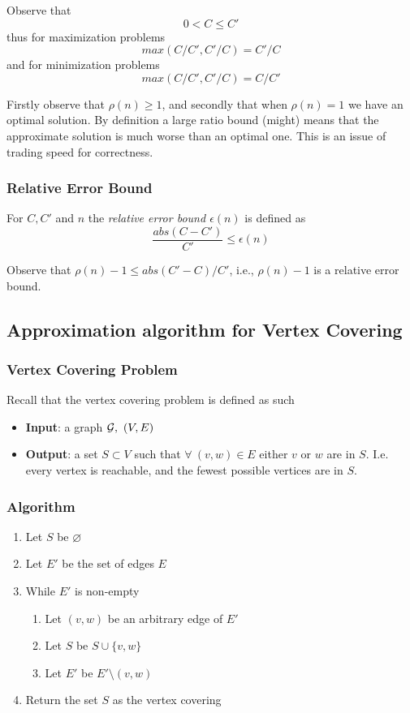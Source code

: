 Observe that
$$ 0 < C \leq C\prime $$
thus for maximization problems
$$ max(C/C\prime, C\prime/C) = C\prime/C $$
and for minimization problems
$$ max(C/C\prime, C\prime/C) = C/C\prime $$

Firstly observe that $\rho(n) \geq 1$,
and secondly that when $\rho(n) = 1$ we have an optimal solution.
By definition a large ratio bound (might) means that the approximate
solution is much worse than an optimal one.
This is an issue of trading speed for correctness.

\subsubsection{Relative Error Bound}
\begin{definition}
    For $C, C\prime$ and $n$  the \textit{relative error bound $\epsilon(n)$} is defined as
    $$\frac{abs(C - C\prime)}{C\prime} \leq \epsilon(n)$$
\end{definition}

Observe that $\rho(n) - 1 \leq abs(C\prime - C)/C\prime$,
i.e., $\rho(n) - 1$ is a relative error bound.

\subsection{Approximation algorithm for Vertex Covering}
\subsubsection{Vertex Covering Problem}
Recall that the vertex covering problem is defined as such
\begin{itemize}
    \item \textbf{Input}:
        a graph $\G,\ (V,E)$
    \item \textbf{Output}:
        a set $S \subset V$ such that $\forall\ (v,w) \in E$
        either $v$ or $w$ are in $S$.
        I.e. every vertex is reachable,
        and the fewest possible vertices are in $S$.
\end{itemize}

\subsubsection{Algorithm}
\begin{enumerate}
    \item Let $S$ be $\varnothing$
    \item Let $E\prime$ be the set of edges $E$
    \item While $E\prime$ is non-empty
        \begin{enumerate}
            \item
                Let $(v,w)$ be an arbitrary edge of $E\prime$
            \item
                Let $S$ be $S \cup \{v,w\}$
            \item
                Let $E\prime$ be $E\prime \setminus (v,w)$
        \end{enumerate}
    \item Return the set $S$ as the vertex covering

\end{enumerate}

